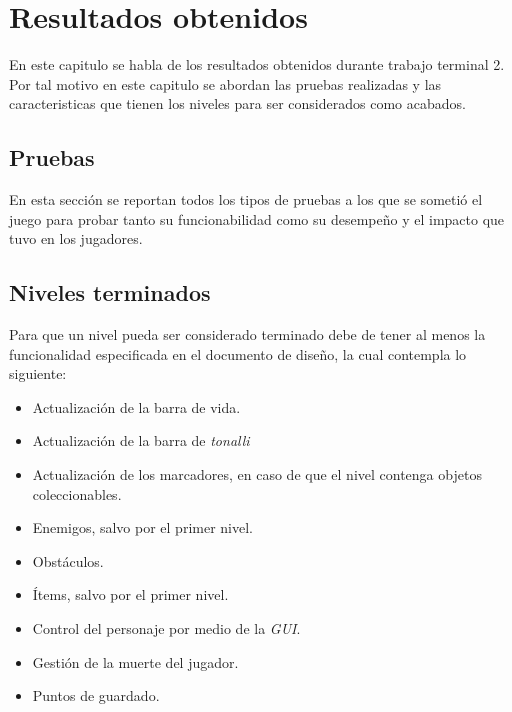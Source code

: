 \chapter{Resultados obtenidos}
En este capitulo se habla de los resultados obtenidos durante trabajo terminal 2. 
Por tal motivo en este capitulo se abordan las pruebas realizadas y las 
caracteristicas que tienen los niveles para ser considerados como acabados.

\section{Pruebas}
En esta sección se reportan todos los tipos de pruebas a los que se sometió el 
juego para probar tanto su funcionabilidad como su desempeño y el impacto que 
tuvo en los jugadores.

%








%

\section{Niveles terminados}
Para que un nivel pueda ser considerado terminado debe de tener al menos la 
funcionalidad especificada en el documento de diseño, la cual contempla lo 
siguiente: 
\begin{itemize}
        \item Actualización de la barra de vida.
        \item Actualización de la barra de \textit{tonalli}
        \item Actualización de los marcadores, en caso de que el nivel contenga objetos 
        coleccionables.
        \item Enemigos, salvo por el primer nivel.
        \item Obstáculos.
        \item Ítems, salvo por el primer nivel.
        \item Control del personaje por medio de la \textit{GUI}.
        \item Gestión de la muerte del jugador.
        \item Puntos de guardado.
\end{itemize} 


